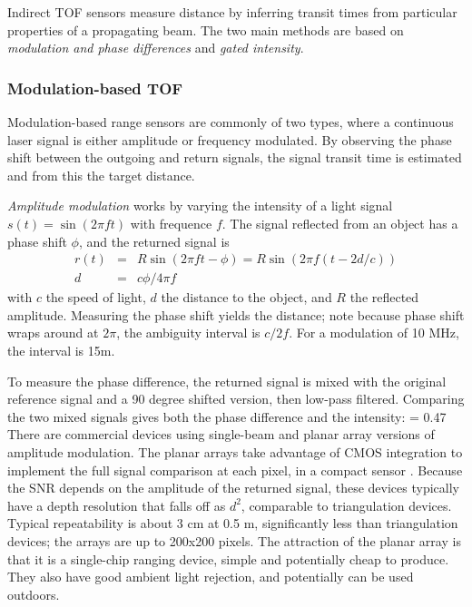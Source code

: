 \documentclass[twocolumn,oneside]{book}
\begin{document}
Indirect TOF sensors measure distance by inferring transit times from
particular properties of a propagating beam.  The two main methods are
based on {\em modulation and phase differences} and {\em gated
  intensity}. 

\subsubsection{Modulation-based TOF}

Modulation-based range sensors are commonly of two types, where a
continuous laser signal is either amplitude or frequency modulated.
By observing the phase shift between the outgoing and return signals,
the signal transit time is estimated and from this the target
distance.  

{\em Amplitude modulation} works by varying the intensity of a light
signal $s(t) = \sin(2\pi f t)$ with frequence $f$.  The signal
reflected from an object has a phase shift $\phi$, and the returned
signal is 
\begin{equation}
\begin{array}{lcl}
r(t) &=& R \sin(2\pi f t -\phi) = R \sin(2\pi f (t - 2d/c)) \\
d &=& c\phi / 4\pi f
\end{array}
\end{equation}
with $c$ the speed of light, $d$ the distance to the object, and $R$
the reflected amplitude.  Measuring the phase shift yields the
distance; note because phase shift wraps around at $2\pi$, the
ambiguity interval is $c/2f$.  For a modulation of 10 MHz, the
interval is 15m.

To measure the phase difference, the returned signal is mixed with the
original reference signal and a 90 degree shifted version, then
low-pass filtered.  Comparing the two mixed signals gives both the
phase difference and the intensity:
{\epsfxsize = 0.47\textwidth {}}
There are commercial devices using single-beam and planar array
versions of amplitude modulation.  The planar arrays take advantage of
CMOS integration to implement the full signal comparison at each
pixel, in a compact sensor \cite{CanestaXXX,SwissRangerXXX}.  Because
the SNR depends on the amplitude of the returned signal, these devices
typically have a depth resolution that falls off as $d^2$, comparable
to triangulation devices.  Typical repeatability is about 3 cm at 0.5
m, significantly less than triangulation devices; the arrays are up to 
200x200 pixels.  The attraction of the planar array is that it is a
single-chip ranging device, simple and potentially cheap to produce.
They also have good ambient light rejection, and potentially can be
used outdoors.
\end{document}

